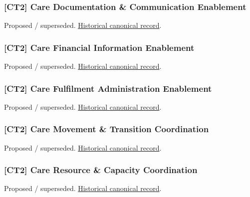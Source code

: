 \subsubsection{[CT2] Care Documentation \& Communication Enablement}

\par\label{element:5ad2e381ec484d1d9062a65eee842fa7}
Proposed / superseded. \href{../../../../continuum/strategy/capability/5ad2e381ec484d1d9062a65eee842fa7.md}{Historical canonical record}.\par

\subsubsection{[CT2] Care Financial Information Enablement}

\par\label{element:59a756b89c604e3e97ee5dede2d6ed89}
Proposed / superseded. \href{../../../../continuum/strategy/capability/59a756b89c604e3e97ee5dede2d6ed89.md}{Historical canonical record}.\par

\subsubsection{[CT2] Care Fulfilment Administration Enablement}

\par\label{element:9f0f4379c1954524ba5e691d0c7d95ab}
Proposed / superseded. \href{../../../../continuum/strategy/capability/9f0f4379c1954524ba5e691d0c7d95ab.md}{Historical canonical record}.\par

\subsubsection{[CT2] Care Movement \& Transition Coordination}

\par\label{element:59b9331fa3c04ef09bf963ad8a5d0d71}
Proposed / superseded. \href{../../../../continuum/strategy/capability/59b9331fa3c04ef09bf963ad8a5d0d71.md}{Historical canonical record}.\par

\subsubsection{[CT2] Care Resource \& Capacity Coordination}

\par\label{element:96f71cb8fa6844d7aa7e9f16759a3a62}
Proposed / superseded. \href{../../../../continuum/strategy/capability/96f71cb8fa6844d7aa7e9f16759a3a62.md}{Historical canonical record}.\par

